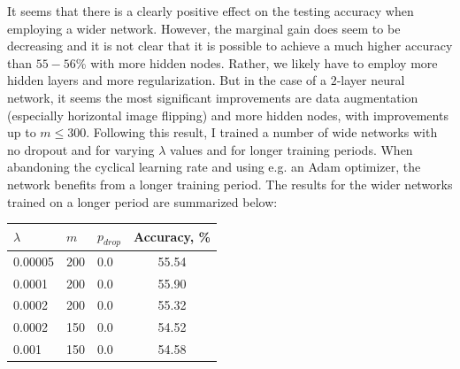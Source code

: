 \documentclass{article}
\begin{document}
	It seems that there is a clearly positive effect on the testing accuracy when employing a wider network. However, the marginal gain does seem to be decreasing and it is not clear that it is possible to achieve a much higher accuracy than $55-56$\% with more hidden nodes. Rather, we likely have to employ more hidden layers and more regularization. But in the case of a $2$-layer neural network, it seems the most significant improvements are data augmentation (especially horizontal image flipping) and more hidden nodes, with improvements up to $m \leq 300$. Following this result, I trained a number of wide networks with no dropout and for varying $\lambda$ values and for longer training periods. When abandoning the cyclical learning rate and using e.g. an Adam optimizer, the network benefits from a longer training period. The results for the wider networks trained on a longer period are summarized below:
	\vspace{0.3cm}
	\begin{center}	
		\begin{tabular}{|l|l|l|c|}
			\hline
			 $\lambda$ & $m$ & $p_{drop}$ & Accuracy, \% \\\hline
			0.00005 & 200 & 0.0 & 55.54 \\
			0.0001 & 200 & 0.0 & 55.90 \\
			0.0002 & 200 & 0.0 & 55.32 \\
			0.0002 & 150 & 0.0 & 54.52 \\
			0.001 & 150 & 0.0 & 54.58 \\\hline
		\end{tabular}
	\end{center}


\newpage
\end{document}
